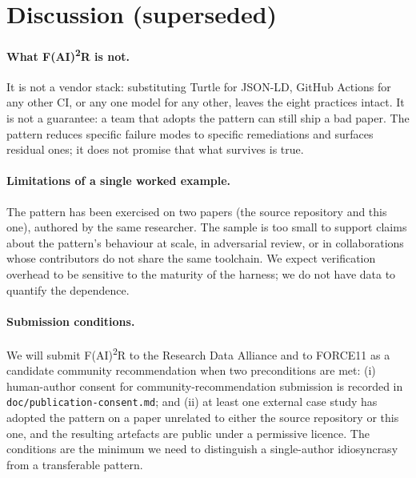 \section{Discussion (superseded)}
\label{sec:discussion}

\paragraph{What F(AI)\textsuperscript{2}R is not.}
It is not a vendor stack: substituting Turtle for JSON-LD, GitHub
Actions for any other CI, or any one model for any other, leaves the
eight practices intact. It is not a guarantee: a team that adopts
the pattern can still ship a bad paper. The pattern reduces specific
failure modes to specific remediations and surfaces residual ones; it
does not promise that what survives is true.

\paragraph{Limitations of a single worked example.}
The pattern has been exercised on two papers (the source repository
and this one), authored by the same researcher. The sample is too
small to support claims about the pattern's behaviour at scale, in
adversarial review, or in collaborations whose contributors do not
share the same toolchain. We expect verification overhead to be
sensitive to the maturity of the harness; we do not have data to
quantify the dependence.

\paragraph{Submission conditions.}
We will submit F(AI)\textsuperscript{2}R to the Research Data
Alliance and to FORCE11 as a candidate community recommendation when
two preconditions are met: (i) human-author consent for
community-recommendation submission is recorded in
\texttt{doc/publication-consent.md}; and (ii) at least one external
case study has adopted the pattern on a paper unrelated to either
the source repository or this one, and the resulting artefacts are
public under a permissive licence. The conditions are the minimum we
need to distinguish a single-author idiosyncrasy from a transferable
pattern.

